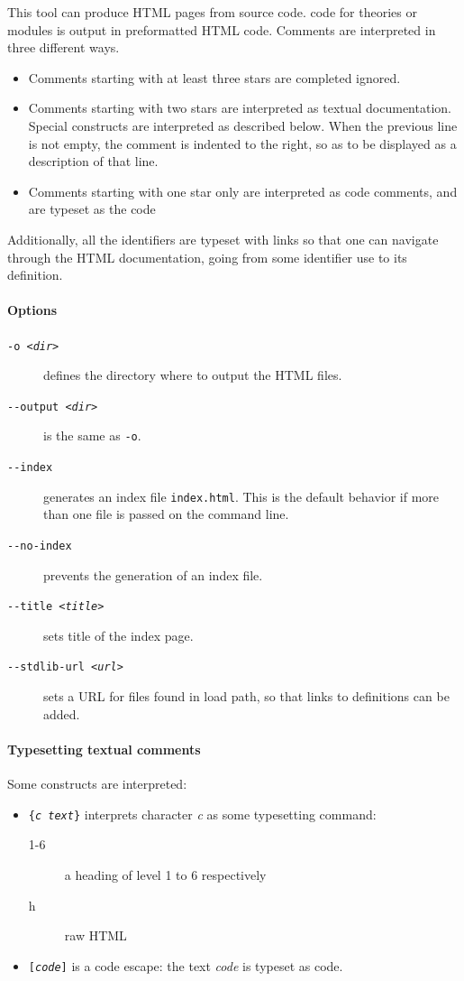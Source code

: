 This tool can produce HTML pages from \why source code.
\why code for theories or modules is output in
preformatted HTML code. Comments are interpreted in three different ways.
\begin{itemize}
\item Comments starting with at least three stars are completed
  ignored.
\item Comments starting with two stars are interpreted as textual
  documentation. Special constructs are interpreted as described
  below. When the previous line is not empty, the comment is indented to
  the right, so as to be displayed as a description of that line.
\item Comments starting with one star only are interpreted as code
  comments, and are typeset as the code
\end{itemize}

Additionally, all the \why identifiers are typeset with links so that
one can navigate through the HTML documentation, going from some
identifier use to its definition.

\paragraph{Options}

\begin{description}
\item[\texttt{-o \textsl{<dir>}}] defines the directory where to
  output the HTML files.
\item[\texttt{-{}-output \textsl{<dir>}}] is the same as \verb|-o|.
\item[\texttt{-{}-index}] generates an index file \texttt{index.html}.
  This is the default behavior if more than one file
  is passed on the command line.
\item[\texttt{-{}-no-index}] prevents the generation of an index file.
\item[\texttt{-{}-title \textsl{<title>}}] sets title of the
  index page.
\item[\texttt{-{}-stdlib-url \textsl{<url>}}] sets a URL for files
  found in load path, so that links to definitions can be added.
\end{description}

\paragraph{Typesetting textual comments}

Some constructs are interpreted:
\begin{itemize}
\item \texttt{\{\textsl{c text}\}} interprets character \textsl{c} as
  some typesetting command:
  \begin{description}
  \item[1-6] a heading of level 1 to 6 respectively
  \item[h] raw HTML
  \end{description}
\item \texttt{[\textsl{code}]} is a code escape: the text
  \textsl{code} is typeset as \why code.
\end{itemize}

